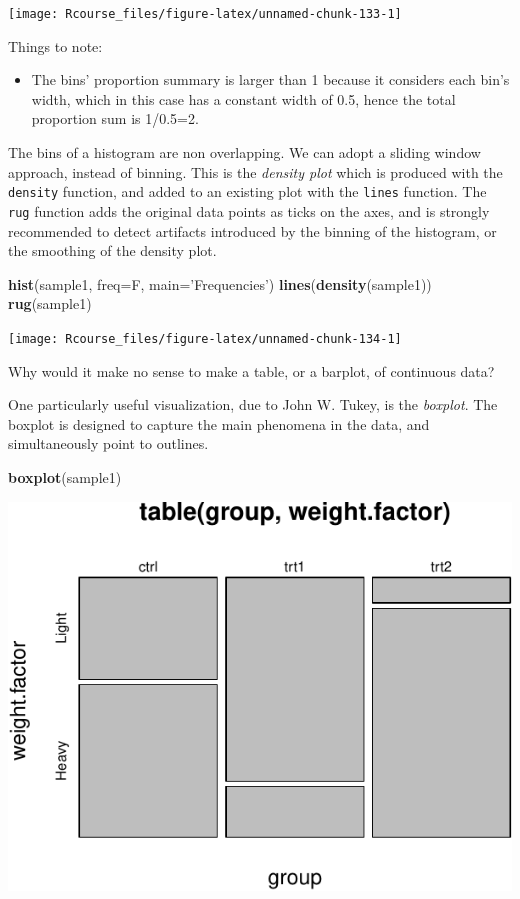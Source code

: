 \documentclass[]{book}
\newenvironment{Shaded}{\begin{snugshade}}{\end{snugshade}}
\newcommand{\KeywordTok}[1]{\textcolor[rgb]{0.13,0.29,0.53}{\textbf{#1}}}
\newcommand{\DataTypeTok}[1]{\textcolor[rgb]{0.13,0.29,0.53}{#1}}
\newcommand{\StringTok}[1]{\textcolor[rgb]{0.31,0.60,0.02}{#1}}
\newcommand{\NormalTok}[1]{#1}
\providecommand{\tightlist}{%
  \setlength{\itemsep}{0pt}\setlength{\parskip}{0pt}}
\theoremstyle{definition}
\theoremstyle{definition}
\theoremstyle{definition}
\theoremstyle{remark}
\let\BeginKnitrBlock\begin \let\EndKnitrBlock\end
\begin{document}
\texttt{[image: Rcourse\_files/figure-latex/unnamed-chunk-133-1]}

Things to note:

\begin{itemize}
\tightlist
\item
  The bins' proportion summary is larger than 1 because it considers
  each bin's width, which in this case has a constant width of 0.5,
  hence the total proportion sum is 1/0.5=2.
\end{itemize}

The bins of a histogram are non overlapping. We can adopt a sliding
window approach, instead of binning. This is the \emph{density plot}
which is produced with the \texttt{density} function, and added to an
existing plot with the \texttt{lines} function. The \texttt{rug}
function adds the original data points as ticks on the axes, and is
strongly recommended to detect artifacts introduced by the binning of
the histogram, or the smoothing of the density plot.

\begin{Shaded}
\begin{Highlighting}[]
\KeywordTok{hist}\NormalTok{(sample1, }\DataTypeTok{freq=}\NormalTok{F, }\DataTypeTok{main=}\StringTok{'Frequencies'}\NormalTok{)   }
\KeywordTok{lines}\NormalTok{(}\KeywordTok{density}\NormalTok{(sample1))                     }
\KeywordTok{rug}\NormalTok{(sample1)}
\end{Highlighting}
\end{Shaded}

\texttt{[image: Rcourse\_files/figure-latex/unnamed-chunk-134-1]}

\BeginKnitrBlock{remark}
{}Why would it make no sense to make a table,
or a barplot, of continuous data?
\EndKnitrBlock{remark}

One particularly useful visualization, due to John W. Tukey, is the
\emph{boxplot}. The boxplot is designed to capture the main phenomena in
the data, and simultaneously point to outlines.

\begin{Shaded}
\begin{Highlighting}[]
\KeywordTok{boxplot}\NormalTok{(sample1)    }
\end{Highlighting}
\end{Shaded}

\includegraphics[width=0.5\linewidth]{Rcourse_files/figure-latex/unnamed-chunk-136-1}
\end{document}
